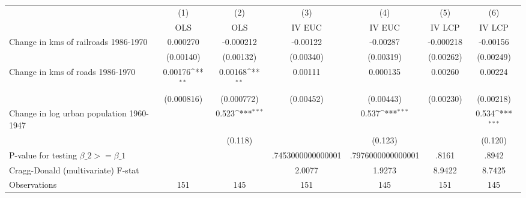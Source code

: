 {
\def\sym#1{\ifmmode^{#1}\else\(^{#1}\)\fi}
\begin{tabular}{l*{6}{c}}
\hline\hline
                &\multicolumn{1}{c}{(1)}&\multicolumn{1}{c}{(2)}&\multicolumn{1}{c}{(3)}&\multicolumn{1}{c}{(4)}&\multicolumn{1}{c}{(5)}&\multicolumn{1}{c}{(6)}\\
                &\multicolumn{1}{c}{OLS}&\multicolumn{1}{c}{OLS}&\multicolumn{1}{c}{IV EUC}&\multicolumn{1}{c}{IV EUC}&\multicolumn{1}{c}{IV LCP}&\multicolumn{1}{c}{IV LCP}\\
\hline
Change in kms of railroads 1986-1970& 0.000270         &-0.000212         & -0.00122         & -0.00287         &-0.000218         & -0.00156         \\
                &(0.00140)         &(0.00132)         &(0.00340)         &(0.00319)         &(0.00262)         &(0.00249)         \\
[1em]
Change in kms of roads 1986-1970&  0.00176\sym{**} &  0.00168\sym{**} &  0.00111         & 0.000135         &  0.00260         &  0.00224         \\
                &(0.000816)         &(0.000772)         &(0.00452)         &(0.00443)         &(0.00230)         &(0.00218)         \\
[1em]
Change in log urban population 1960-1947&                  &    0.523\sym{***}&                  &    0.537\sym{***}&                  &    0.534\sym{***}\\
                &                  &  (0.118)         &                  &  (0.123)         &                  &  (0.120)         \\
\hline
P-value for testing $\beta\_{2} >= \beta\_{1}$&                  &                  &.7453000000000001         &.7976000000000001         &    .8161         &    .8942         \\
Cragg-Donald (multivariate) F-stat&                  &                  &   2.0077         &   1.9273         &   8.9422         &   8.7425         \\
Observations    &      151         &      145         &      151         &      145         &      151         &      145         \\
\hline\hline
\end{tabular}
}

